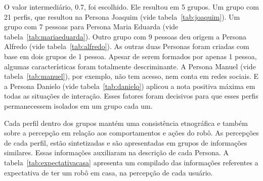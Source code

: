 O valor intermediário, 0.7, foi escolhido. Ele resultou em 5 grupos. Um grupo com 21 perfis, que resultou na Persona Joaquim (vide tabela~\ref{tab:joaquim}). Um grupo com 7 pessoas para Persona Maria Eduarda (vide tabela~\ref{tab:mariaeduarda}). Outro grupo com 9 pessoas deu origem a Persona Alfredo (vide tabela~\ref{tab:alfredo}). As outras duas Personas foram criadas com base em dois grupos de 1 pessoa. Apesar de serem formados por apenas 1 pessoa, algumas características foram totalmente descriminante. A Persona Manuel (vide tabela~\ref{tab:manuel}), por exemplo, não tem acesso, nem conta em redes sociais. E a Persona Danielo (vide tabela~\ref{tab:danielo}) aplicou a nota positiva máxima em todas as situações de interação. Esses fatores foram decisivos para que esses perfis permanecessem isolados em um grupo cada um.

Cada perfil dentro dos grupos mantém uma consistência etnográfica e também sobre a percepção em relação aos comportamentos e ações do robô. As percepções de cada perfil, estão sintetizadas e são apresentadas em grupos de informações similares. Essas informações auxiliaram na descrição de cada Persona. A tabela~\ref{tab:expectativacasa} apresenta um compilado das informações referentes a expectativa de ter um robô em casa, na percepção de cada usuário.

